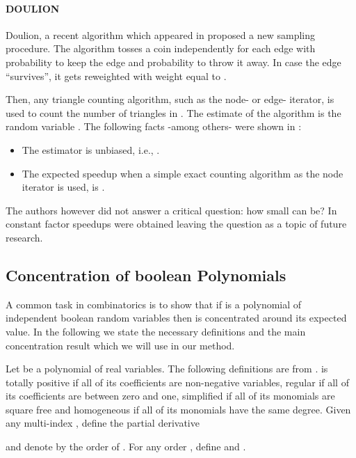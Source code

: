 \documentclass{llncs}
\newcommand{\hide}[1]{}
\begin{document}
\paragraph{DOULION} 

Doulion, a recent algorithm which appeared in \cite{Tsourakakiskdd09} proposed a new sampling procedure. 
The algorithm tosses a coin independently for each edge with probability  to keep the edge and probability 
to throw it away. In case the edge ``survives'', it gets reweighted with weight equal to .
\hide{Observe that since the initial graph was unweighted, all edges in the resulting sparsified graph  have
weight equal to ,  and thus a single number has to be stored, i.e., . }
Then, any triangle counting algorithm, such as the node- or edge- iterator, is used to count
the number of triangles  in .  The estimate of the algorithm is the random variable .
The following facts  -among others- were shown in \cite{Tsourakakiskdd09}: 
\begin{itemize}
\item The estimator  is unbiased, i.e., .
\item The expected speedup when a simple exact counting algorithm as the node iterator is used, is . 
\end{itemize}

The authors however did not answer a critical question: how small can  be? In \cite{Tsourakakiskdd09}
constant factor speedups were obtained leaving the question as a topic of future research.



\subsection{Concentration of boolean Polynomials}
A common task in combinatorics is to show that if  is a polynomial
of independent boolean random variables then  is concentrated 
around its expected value. In the following we state the necessary definitions
and the main concentration result which we will use in our method. 

Let  be a polynomial of  real variables. The following definitions are from \cite{tao-vu}.
 is totally positive if all of its coefficients are non-negative variables,
regular if all of its coefficients are between zero and one, 
simplified if all of its monomials are square free and homogeneous if all of its monomials have the same degree. 
Given any multi-index , define the partial derivative

and denote by  the order of .
For any order , define 
and .
\end{document}
